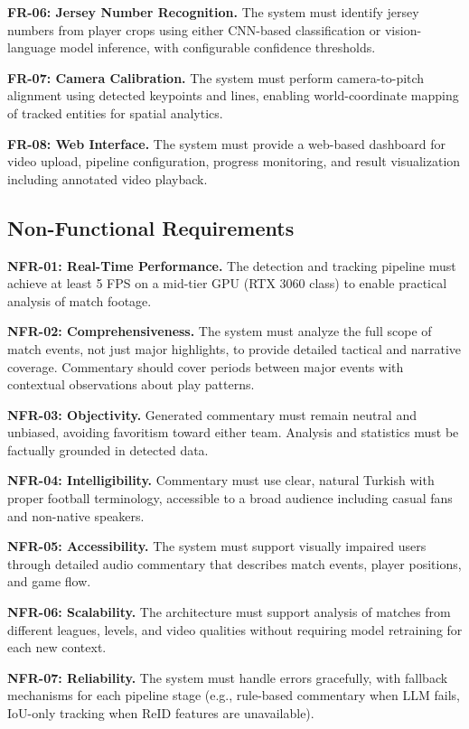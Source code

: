 \documentclass[10pt,twocolumn,a4paper]{article}
\begin{document}
\textbf{FR-06: Jersey Number Recognition.} The system must identify jersey numbers from player crops using either CNN-based classification or vision-language model inference, with configurable confidence thresholds.

\textbf{FR-07: Camera Calibration.} The system must perform camera-to-pitch alignment using detected keypoints and lines, enabling world-coordinate mapping of tracked entities for spatial analytics.

\textbf{FR-08: Web Interface.} The system must provide a web-based dashboard for video upload, pipeline configuration, progress monitoring, and result visualization including annotated video playback.

\subsection{Non-Functional Requirements}

\textbf{NFR-01: Real-Time Performance.} The detection and tracking pipeline must achieve at least 5 FPS on a mid-tier GPU (RTX 3060 class) to enable practical analysis of match footage.

\textbf{NFR-02: Comprehensiveness.} The system must analyze the full scope of match events, not just major highlights, to provide detailed tactical and narrative coverage. Commentary should cover periods between major events with contextual observations about play patterns.

\textbf{NFR-03: Objectivity.} Generated commentary must remain neutral and unbiased, avoiding favoritism toward either team. Analysis and statistics must be factually grounded in detected data.

\textbf{NFR-04: Intelligibility.} Commentary must use clear, natural Turkish with proper football terminology, accessible to a broad audience including casual fans and non-native speakers.

\textbf{NFR-05: Accessibility.} The system must support visually impaired users through detailed audio commentary that describes match events, player positions, and game flow.

\textbf{NFR-06: Scalability.} The architecture must support analysis of matches from different leagues, levels, and video qualities without requiring model retraining for each new context.

\textbf{NFR-07: Reliability.} The system must handle errors gracefully, with fallback mechanisms for each pipeline stage (e.g., rule-based commentary when LLM fails, IoU-only tracking when ReID features are unavailable).
\end{document}
